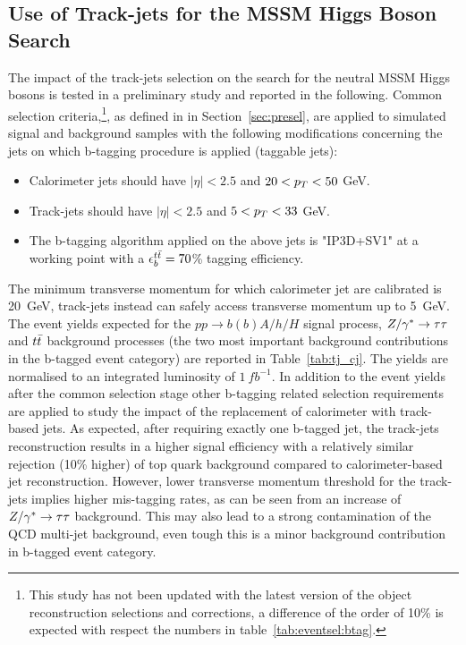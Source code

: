\subsection{ Use of Track-jets for the MSSM Higgs Boson Search} %
The impact of the track-jets selection on the search for the neutral MSSM Higgs bosons is tested in a 
preliminary study and reported in the  following. 
Common selection criteria,\footnote{This study has not been updated with the latest version of the object reconstruction 
		selections and corrections, a difference of the order of 10\% is expected with respect the 
	    	numbers in table~\ref{tab:eventsel:btag}.},
as defined in in Section~\ref{sec:presel}, are applied to simulated signal and background samples with the following modifications
concerning the jets on which b-tagging procedure is applied (taggable jets):
\begin{itemize}
\item Calorimeter jets should have $|\eta| < 2.5$ and $20 < p_{T} < 50$ GeV.
\item Track-jets should have $|\eta| < 2.5$ and $5 < p_{T} < 33$ GeV.
\item The b-tagging algorithm applied on the above jets is "IP3D+SV1" at a 
	working point with a $\epsilon_b^{t\bar{t}}=70$\% tagging efficiency.
\end{itemize}
The minimum transverse momentum for which calorimeter jet are calibrated is 20~GeV, track-jets instead can 
safely access transverse momentum up to 5~GeV.
The event yields expected for the $pp \rightarrow b(b)A/h/H$ signal process, $Z/\gamma^*\rightarrow \tau\tau$  and $t\bar{t}$ background processes
(the two most important background contributions in the b-tagged event category) 
are reported in Table~\ref{tab:tj_cj}. The yields are  normalised to an integrated luminosity of $1 ~ fb^{-1}$.
In addition to the event yields after the common selection stage other b-tagging related selection
requirements  are applied to study the impact of the replacement of calorimeter with track-based jets.
As expected, after requiring exactly one b-tagged jet, the track-jets reconstruction 
results in a higher signal efficiency with a relatively similar rejection (10\% higher) of top quark 
background compared to calorimeter-based jet reconstruction.
However, lower transverse momentum threshold for the  track-jets implies higher mis-tagging rates,
as can be seen from an increase of $Z/\gamma^*\rightarrow \tau\tau$ background. This may also lead to a strong contamination of the 
QCD multi-jet background, even tough this is a minor background contribution in b-tagged event category.

